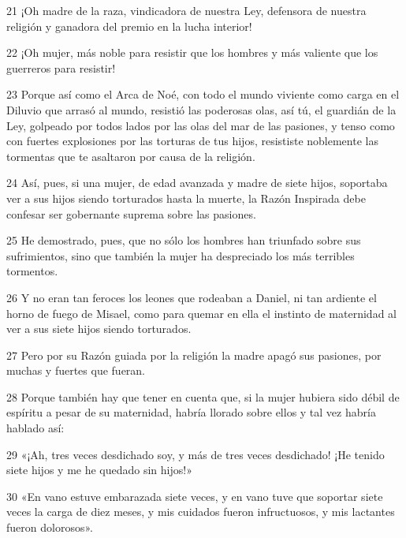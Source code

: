 \par 21 ¡Oh madre de la raza, vindicadora de nuestra Ley, defensora de nuestra religión y ganadora del premio en la lucha interior!

\par 22 ¡Oh mujer, más noble para resistir que los hombres y más valiente que los guerreros para resistir!

\par 23 Porque así como el Arca de Noé, con todo el mundo viviente como carga en el Diluvio que arrasó al mundo, resistió las poderosas olas, así tú, el guardián de la Ley, golpeado por todos lados por las olas del mar de las pasiones, y tenso como con fuertes explosiones por las torturas de tus hijos, resististe noblemente las tormentas que te asaltaron por causa de la religión.

\par 24 Así, pues, si una mujer, de edad avanzada y madre de siete hijos, soportaba ver a sus hijos siendo torturados hasta la muerte, la Razón Inspirada debe confesar ser gobernante suprema sobre las pasiones.

\par 25 He demostrado, pues, que no sólo los hombres han triunfado sobre sus sufrimientos, sino que también la mujer ha despreciado los más terribles tormentos.

\par 26 Y no eran tan feroces los leones que rodeaban a Daniel, ni tan ardiente el horno de fuego de Misael, como para quemar en ella el instinto de maternidad al ver a sus siete hijos siendo torturados.

\par 27 Pero por su Razón guiada por la religión la madre apagó sus pasiones, por muchas y fuertes que fueran.

\par 28 Porque también hay que tener en cuenta que, si la mujer hubiera sido débil de espíritu a pesar de su maternidad, habría llorado sobre ellos y tal vez habría hablado así:

\par 29 «¡Ah, tres veces desdichado soy, y más de tres veces desdichado! ¡He tenido siete hijos y me he quedado sin hijos!»

\par 30 «En vano estuve embarazada siete veces, y en vano tuve que soportar siete veces la carga de diez meses, y mis cuidados fueron infructuosos, y mis lactantes fueron dolorosos».


